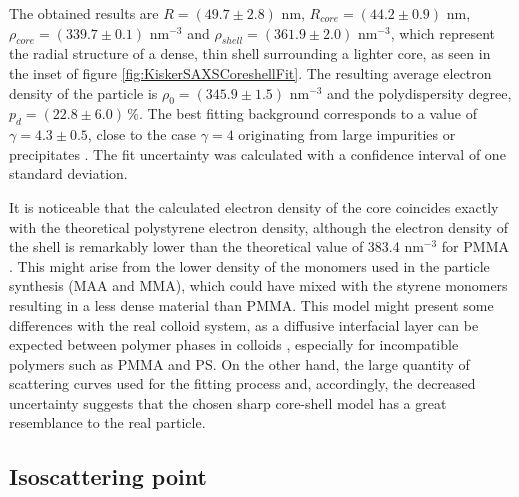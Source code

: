 The obtained results are \(R=\left(49.7 \pm 2.8\right) \) nm, \(R_{core}=\left(44.2 \pm 0.9\right) \) nm, \(\rho_{core}=\left(339.7 \pm 0.1\right)\) nm\(^{-3}\) and \(\rho_{shell}=\left(361.9 \pm 2.0\right)\) nm\(^{-3}\), which represent the radial structure of a dense, thin shell surrounding a lighter core, as seen in the inset of figure \ref{fig:KiskerSAXSCoreshellFit}. The resulting average electron density of the particle is \(\rho_{0}=\left(345.9 \pm 1.5\right)\) nm\(^{-3}\) and the polydispersity degree, \(p_d=\left(22.8\pm 6.0\right)\,\%\). The best fitting background corresponds to a value of \( \gamma = 4.3\pm 0.5 \), close to the case \( \gamma = 4 \) originating from large impurities or precipitates \citet{pedersen_determination_1994}. The fit uncertainty was calculated with a confidence interval of one standard deviation. 

It is noticeable that the calculated electron density of the core coincides exactly with the theoretical polystyrene electron density, although the electron density of the shell is remarkably lower than the theoretical value of 383.4 nm\(^{-3}\) for PMMA \citet{ballauff_saxs_2001-1}. This might arise from the lower density of the monomers used in the particle synthesis (MAA and MMA), which could have mixed with the styrene monomers resulting in a less dense material than PMMA. This model might present some differences with the real colloid system, as a diffusive interfacial layer can be expected between polymer phases in colloids \citet{dingenouts_interface_1994}, especially for incompatible polymers such as PMMA and PS. On the other hand, the large quantity of scattering curves used for the fitting process and, accordingly, the decreased uncertainty suggests that the chosen sharp core-shell model has a great resemblance to the real particle.

\subsection{Isoscattering point}
